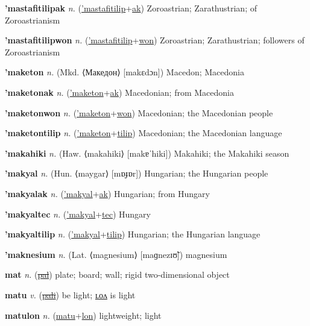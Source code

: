 \textbf{\hypertarget{'mastafitilipak}{'mastafitilipak}} \textit{n.} (\hyperlink{'mastafitilip}{'mastafitilip}+\allowbreak \hyperlink{ak}{ak})
Zoroastrian; Zarathustrian; of Zoroastrianism

\textbf{\hypertarget{'mastafitilipwon}{'mastafitilipwon}} \textit{n.} (\hyperlink{'mastafitilip}{'mastafitilip}+\allowbreak \hyperlink{won}{won})
Zoroastrian; Zarathustrian; followers of Zoroastrianism

\textbf{\hypertarget{'maketon}{'maketon}} \textit{n.} (Mkd. ⟨Македон⟩ [makɛdɔn])
Macedon; Macedonia

\textbf{\hypertarget{'maketonak}{'maketonak}} \textit{n.} (\hyperlink{'maketon}{'maketon}+\allowbreak \hyperlink{ak}{ak})
Macedonian; from Macedonia

\textbf{\hypertarget{'maketonwon}{'maketonwon}} \textit{n.} (\hyperlink{'maketon}{'maketon}+\allowbreak \hyperlink{won}{won})
Macedonian; the Macedonian people

\textbf{\hypertarget{'maketontilip}{'maketontilip}} \textit{n.} (\hyperlink{'maketon}{'maketon}+\allowbreak \hyperlink{tilip}{tilip})
Macedonian; the Macedonian language

\textbf{\hypertarget{'makahiki}{'makahiki}} \textit{n.} (Haw. ⟨makahiki⟩ [makɐˈhiki])
Makahiki; the Makahiki season

\textbf{\hypertarget{'makyal}{'makyal}} \textit{n.} (Hun. ⟨maygar⟩ [mɒɟɒr])
Hungarian; the Hungarian people

\textbf{\hypertarget{'makyalak}{'makyalak}} \textit{n.} (\hyperlink{'makyal}{'makyal}+\allowbreak \hyperlink{ak}{ak})
Hungarian; from Hungary

\textbf{\hypertarget{'makyaltec}{'makyaltec}} \textit{n.} (\hyperlink{'makyal}{'makyal}+\allowbreak \hyperlink{tec}{tec})
Hungary

\textbf{\hypertarget{'makyaltilip}{'makyaltilip}} \textit{n.} (\hyperlink{'makyal}{'makyal}+\allowbreak \hyperlink{tilip}{tilip})
Hungarian; the Hungarian language

\textbf{\hypertarget{'maknesium}{'maknesium}} \textit{n.} (Lat. ⟨magnesium⟩ [maɡnezɪʊ̃])
magnesium

\textbf{\hypertarget{mat}{mat}} \textit{n.} (\hyperlink{pal}{\sout{pal}})
plate; board; wall; rigid two-dimensional object

\textbf{\hypertarget{matu}{matu}} \textit{v.} (\hyperlink{pali}{\sout{pali}})
be light; \hyperlink{matulon}{ʟᴏᴧ} is light

\textbf{\hypertarget{matulon}{matulon}} \textit{n.} (\hyperlink{matu}{matu}+\allowbreak \hyperlink{lon}{lon})
lightweight; light


